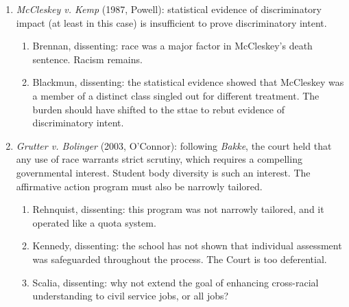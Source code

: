\begin{enumerate}
    Stewart): the Court elaborated the \emph{Davis} discriminatory purpose 
    requirement, holding that foreseeable impact ``was not sufficient to prove 
    discriminatory purpose under the Equal Protection Clause'':
    \begin{enumerate}
        \item \enquote{\enquote{Discriminatory purpose}~.~.~.~implies more 
        than intent as volition or intent as awareness of consequences. It 
        implies that the decisionmaker, in this case a state legislature, 
        selected or reaffirmed a particular course of action at least in part 
        \textbf{`because of,' not merely `in spite of,' its adverse effects 
        upon an identifiable group.}}\footnote{Casebook p. 1031.}
    \end{enumerate}
    \item \emph{McCleskey v. Kemp} (1987, Powell): statistical evidence of 
    discriminatory impact (at least in this case) is insufficient to prove
    discriminatory intent. 
    \begin{enumerate}
        \item Brennan, dissenting: race was a major factor in McCleskey's 
        death sentence. Racism remains.
        \item Blackmun, dissenting: the statistical evidence showed that 
        McCleskey was a member of a distinct class singled out for different 
        treatment. The burden should have shifted to the sttae to rebut 
        evidence of discriminatory intent.
    \end{enumerate}
    \item \emph{Grutter v. Bolinger} (2003, O'Connor): following  
    \emph{Bakke}, the court held that any use of race warrants strict 
    scrutiny, which requires a compelling governmental interest. Student body 
    diversity is such an interest. The affirmative action program must also be 
    narrowly tailored.
    \begin{enumerate}
        \item Rehnquist, dissenting: this program was not narrowly tailored, 
        and it operated like a quota system.
        \item Kennedy, dissenting: the school has not shown that individual 
        assessment was safeguarded throughout the process. The Court is too 
        deferential.
        \item Scalia, dissenting: why not extend the goal of enhancing 
        cross-racial understanding to civil service jobs, or all jobs?

\end{enumerate}
\end{enumerate}
